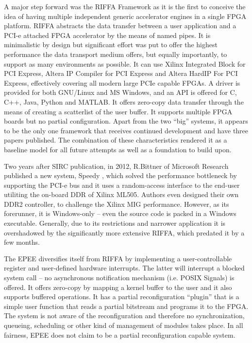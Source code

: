 A major step forward was the RIFFA Framework \cite{riffa} as it is the first to conceive the idea of having multiple 
independent generic accelerator engines in a single FPGA platform.
RIFFA abstracts the data transfer between a user application and a PCI-e attached FPGA accelerator by the means of named pipes. 
It is minimalistic by design but significant effort was put to offer the highest performance the data transport medium offers,
but equally importantly, to support as many environments as possible.
It can use Xilinx Integrated Block for PCI Express, Altera IP Compiler for PCI Express and Altera HardIP For PCI Express,
effectively covering all modern large PCIe capable FPGAs. A driver is provided for both GNU/Linux and MS Windows,
and an API is offered for C, C++, Java, Python and MATLAB. It offers zero-copy data transfer through the means of
creating a \gls{scatterlist} of the user buffer. It supports multiple FPGA boards but no partial configuration. 
Apart from the two ``big'' systems, it appears to be the only one framework that receives continued development and have three papers published.
The combination of these characteristics rendered it as a baseline model for all future attempts as well as a foundation to build upon.

Two years after SIRC publication, in 2012, R.Bittner of Microsoft Research published a new system, 
Speedy \cite{speedy}, which solved the performance bottleneck by supporting the PCI-e bus 
and it uses a random-access interface to the end-user utiliting the on-board DDR of Xilinx ML505.
Authors even designed their own DDR2 controller, to challenge the Xilinx MIG performance.
However, as its forerunner, it is Windows-only -- even the source code is packed in a Windows executable.
Generally, due to its restrictions and narrower application it is overshadowed by the significantly more extensive RIFFA,
which predated it by a few months.

The EPEE \cite{epee} diversifies itself from RIFFA by implementing a user-controllable register and user-defined hardware interrupts.
The latter will interrupt a blocked system call -- no asynchronous notification mechanism (i.e. POSIX Signals) is offered.
It offers zero-copy by mapping a kernel buffer to the user and it also supports buffered operations. 
It has a partial reconfiguration ``plugin'' that is a simple user function that reads a partial bitstream and programs it to the FPGA.
The system is not aware of the reconfiguration and therefore no synchronization, 
queueing, scheduling or other kind of management of modules takes place.
In all fairness, EPEE does not claim to be a partial reconfiguration capable system.

